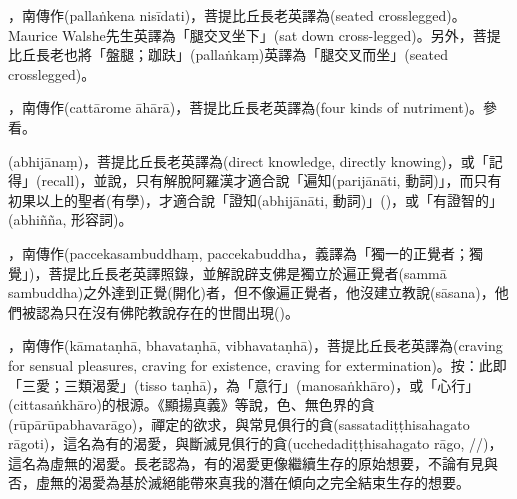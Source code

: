 \startitemgroup[noteitems]
\item{}，南傳作(pallaṅkena nisīdati)，菩提比丘長老英譯為(seated crosslegged)。Maurice Walshe先生英譯為「腿交叉坐下」(sat down cross-legged)。另外，菩提比丘長老也將「盤腿；跏趺」(pallaṅkaṃ)英譯為「腿交叉而坐」(seated crosslegged)。
\stopitemgroup

\startitemgroup[noteitems]
\item{}，南傳作(cattārome āhārā)，菩提比丘長老英譯為(four kinds of nutriment)。參看。
\stopitemgroup

\startitemgroup[noteitems]
\item{}(abhijānaṃ)，菩提比丘長老英譯為(direct knowledge, directly knowing)，或「記得」(recall)，並說，只有解脫阿羅漢才適合說「遍知(parijānāti, 動詞)」，而只有初果以上的聖者(有學)，才適合說「證知(abhijānāti, 動詞)」()，或「有證智的」(abhiñña, 形容詞)。
\stopitemgroup

\startitemgroup[noteitems]
\item{}，南傳作(paccekasambuddhaṃ, paccekabuddha，義譯為「獨一的正覺者；獨覺」)，菩提比丘長老英譯照錄，並解說辟支佛是獨立於遍正覺者(sammā sambuddha)之外達到正覺(開化)者，但不像遍正覺者，他沒建立教說(sāsana)，他們被認為只在沒有佛陀教說存在的世間出現()。
\stopitemgroup

\startitemgroup[noteitems]
\item{}，南傳作(kāmataṇhā, bhavataṇhā, vibhavataṇhā)，菩提比丘長老英譯為(craving for sensual pleasures, craving for existence, craving for extermination)。按：此即「三愛；三類渴愛」(tisso taṇhā)，為「意行」(manosaṅkhāro)，或「心行」(cittasaṅkhāro)的根源。《顯揚真義》等說，色、無色界的貪(rūpārūpabhavarāgo)，禪定的欲求，與常見俱行的貪(sassatadiṭṭhisahagato rāgoti)，這名為有的渴愛，與斷滅見俱行的貪(ucchedadiṭṭhisahagato rāgo, //)，這名為虛無的渴愛。長老認為，有的渴愛更像繼續生存的原始想要，不論有見與否，虛無的渴愛為基於滅絕能帶來真我的潛在傾向之完全結束生存的想要。
\stopitemgroup


